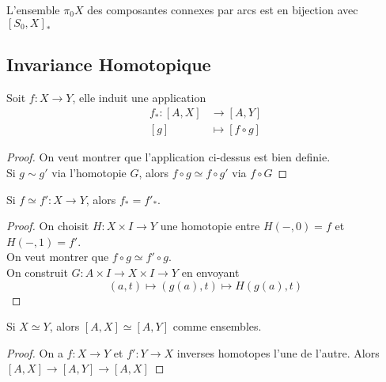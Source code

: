 \documentclass[../main.tex]{subfiles}
\begin{document}
\begin{propo}
	L'ensemble $\pi_0X$ des composantes connexes par arcs est en bijection avec $[S_0,X]_\ast$ 
\end{propo}
\subsection{Invariance Homotopique}
Soit $f:X\to Y$, elle induit une application
\begin{align*}
	f_\ast: [ A,X] &\to [ A,Y] \\
	[ g] &\mapsto [ f\circ g] 
\end{align*}
\begin{proof}
On veut montrer que l'application ci-dessus est bien definie.\\
Si $g\sim g'$ via l'homotopie $G$, alors $f\circ g \simeq f\circ g'$ via $f\circ G$ 
\end{proof}
\begin{propo}
Si $f\simeq f': X\to Y$, alors $f_\ast = f'_\ast$.
\end{propo}
\begin{proof}
On choisit $H:X\times I\to Y$ une homotopie entre $H( -,0) =f$ et $H( -,1) = f'$.\\
On veut montrer que $f\circ g\simeq f'\circ g$.\\
On construit $G: A\times I\to X\times I\to Y$ en envoyant
\[ 
	( a,t) \mapsto ( g( a) ,t ) \mapsto H( g( a) ,t) 
\]
	
\end{proof}
\begin{crly}
Si $X\simeq Y$, alors $ [ A,X] \simeq [ A,Y] $ comme ensembles.
\end{crly}
\begin{proof}
	On a $f:X\to Y$ et $f':Y\to X$ inverses homotopes l'une de l'autre. Alors $ [ A,X] \to [ A,Y]\to [ A,X]  $ 
\end{proof}
\end{document}
